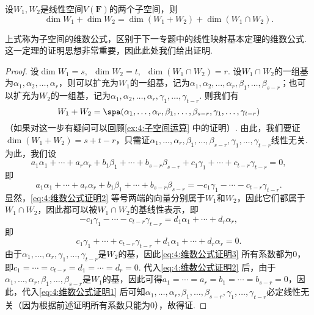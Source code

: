 \begin{theorem}[维数公式]\label{thm:4:维数公式}
    设$W_1,W_2$是线性空间$V(\mathbf{F})$的两个子空间，则
    \[\dim W_1+\dim W_2=\dim(W_1+W_2)+\dim(W_1\cap W_2).\]
\end{theorem}
上式称为子空间的维数公式，区别于下一专题中的线性映射基本定理的维数公式. 这一定理的证明思想非常重要，因此此处我们给出证明.

\begin{proof}
    设$\dim W_1=s,\enspace \dim W_2=t,\enspace \dim(W_1\cap W_2)=r$. 设$W_1\cap W_2$的一组基为$\alpha_1,\alpha_2,\ldots,\alpha_r$，则可以扩充为$W_1$的一组基，记为$\alpha_1,\alpha_2,\ldots,\alpha_r,\beta_1,\ldots,\beta_{s-r}$；也可以扩充为$W_2$的一组基，记为$\alpha_1,\alpha_2,\ldots,\alpha_r,\gamma_1,\ldots,\gamma_{t-r}$. 则我们有
    \[W_1+W_2=\spa(\alpha_1,\ldots,\alpha_r,\beta_1,\ldots,\beta_{s-r},\gamma_1,\ldots,\gamma_{t-r})\]
    （如果对这一步有疑问可以回顾\autoref{ex:4:子空间运算} 中的证明）. 由此，我们要证$\dim (W_1+W_2)=s+t-r$，只需证$\alpha_1,\ldots,\alpha_r,\beta_1,\ldots,\beta_{s-r},\gamma_1,\ldots,\gamma_{t-r}$线性无关. 为此，我们设
    \begin{equation}\label{eq:4:维数公式证明1}
        a_1\alpha_1+\cdots+a_r\alpha_r+b_1\beta_1+\cdots+b_{s-r}\beta_{s-r}+c_1\gamma_1+\cdots+c_{t-r}\gamma_{t-r}=0,
    \end{equation}
    即
    \begin{equation}\label{eq:4:维数公式证明2}
        a_1\alpha_1+\cdots+a_r\alpha_r+b_1\beta_1+\cdots+b_{s-r}\beta_{s-r}=-c_1\gamma_1-\cdots-c_{t-r}\gamma_{t-r}.
    \end{equation}
    显然，\autoref{eq:4:维数公式证明2} 等号两端的向量分别属于$W_1$和$W_2$，因此它们都属于$W_1\cap W_2$，因此都可以被$W_1\cap W_2$的基线性表示，即
    \[-c_1\gamma_1-\cdots-c_{t-r}\gamma_{t-r}=d_1\alpha_1+\cdots+d_r\alpha_r,\]
    即
    \begin{equation}\label{eq:4:维数公式证明3}
        c_1\gamma_1+\cdots+c_{t-r}\gamma_{t-r}+d_1\alpha_1+\cdots+d_r\alpha_r=0.
    \end{equation}
    由于$\alpha_1,\ldots,\alpha_r,\gamma_1,\ldots,\gamma_{t-r}$是$W_2$的基，因此\autoref{eq:4:维数公式证明3} 所有系数都为0，即$c_1=\cdots=c_{t-r}=d_1=\cdots=d_r=0$. 代入\autoref{eq:4:维数公式证明2} 后，由于$\alpha_1,\dots,\alpha_r,\beta_1,\dots,\beta_{s-r}$是$W_1$的基，因此可得$a_1=\cdots=a_r=b_1=\cdots=b_{s-r}=0$，因此，代入\autoref{eq:4:维数公式证明1} 后可知$\alpha_1,\ldots,\alpha_r,\beta_1,\ldots,\beta_{s-r},\gamma_1,\ldots,\gamma_{t-r}$必定线性无关（因为根据前述证明所有系数只能为0），故得证.
\end{proof}


